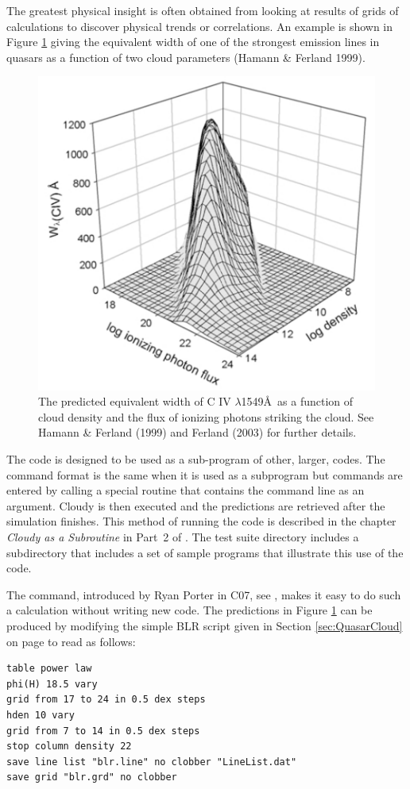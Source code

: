\documentclass[12pt,twoside]{article}
\begin{document}
The greatest physical insight is often obtained from looking at results
of grids of calculations to discover physical trends or correlations.  An
example is shown in Figure \ref{fig:CIV_equivalent_width}
giving the equivalent width of one of the
strongest emission lines in quasars as a function of two cloud parameters
(Hamann \& Ferland 1999).

\begin{figure}
\begin{center}
\includegraphics[clip=on,width=0.8\columnwidth,height=0.8\textheight,keepaspectratio]{CIV_equivalent_width}
\end{center}
\caption{The predicted equivalent width of
C IV $\lambda$1549\AA\ as a function of cloud density
and the flux of ionizing photons striking the cloud.  See Hamann \& Ferland
(1999) and Ferland (2003) for further details.}
\label{fig:CIV_equivalent_width}
\end{figure}

The code is designed to be used as a sub-program of other, larger, codes.
The command format is the same when it is used as a subprogram but commands
are entered by calling a special routine that contains the command line
as an argument.  Cloudy is then executed and the predictions are retrieved
after the simulation finishes.  This method of running the code is described
in the chapter \emph{Cloudy as a Subroutine} in Part~2 of \Hazy.
The test suite
directory includes a subdirectory 
that includes a set of sample
programs that illustrate this use of the code.

The  command, introduced by
Ryan Porter in C07, see \citet{PorterEtAl06},
makes it easy to do such a calculation without writing new code.  The
predictions in Figure \ref{fig:CIV_equivalent_width}
can be produced by modifying the simple BLR script
given in Section \ref{sec:QuasarCloud} on page
\pageref{sec:QuasarCloud} to read as follows:
\small
\begin{verbatim}
table power law
phi(H) 18.5 vary
grid from 17 to 24 in 0.5 dex steps
hden 10 vary
grid from 7 to 14 in 0.5 dex steps
stop column density 22
save line list "blr.line" no clobber "LineList.dat"
save grid "blr.grd" no clobber
\end{verbatim}
\normalsize
\end{document}
